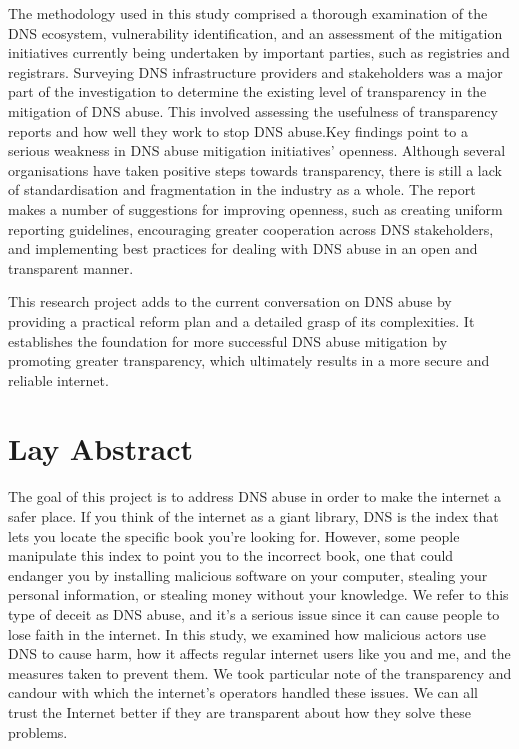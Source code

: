 \documentclass[a4paper,oneside,12pt]{book}
\numberwithin{equation}{chapter} %
\begin{document}
The methodology used in this study comprised a thorough examination of the DNS ecosystem, vulnerability identification, and an assessment of the mitigation initiatives currently being undertaken by important parties, such as registries and registrars. Surveying DNS infrastructure providers and stakeholders was a major part of the investigation to determine the existing level of transparency in the mitigation of DNS abuse. This involved assessing the usefulness of transparency reports and how well they work to stop DNS abuse.Key findings point to a serious weakness in DNS abuse mitigation initiatives' openness. Although several organisations have taken positive steps towards transparency, there is still a lack of standardisation and fragmentation in the industry as a whole. The report makes a number of suggestions for improving openness, such as creating uniform reporting guidelines, encouraging greater cooperation across DNS stakeholders, and implementing best practices for dealing with DNS abuse in an open and transparent manner.

This research project adds to the current conversation on DNS abuse by providing a practical reform plan and a detailed grasp of its complexities. It establishes the foundation for more successful DNS abuse mitigation by promoting greater transparency, which ultimately results in a more secure and reliable internet.




\chapter*{Lay Abstract}

The goal of this project is to address DNS abuse in order to make the internet a safer place. If you think of the internet as a giant library, DNS is the index that lets you locate the specific book you're looking for. However, some people manipulate this index to point you to the incorrect book, one that could endanger you by installing malicious software on your computer, stealing your personal information, or stealing money without your knowledge. We refer to this type of deceit as DNS abuse, and it's a serious issue since it can cause people to lose faith in the internet. In this study, we examined how malicious actors use DNS to cause harm, how it affects regular internet users like you and me, and the measures taken to prevent them. We took particular note of the transparency and candour with which the internet's operators handled these issues. We can all trust the Internet better if they are transparent about how they solve these problems. 
\end{document}
